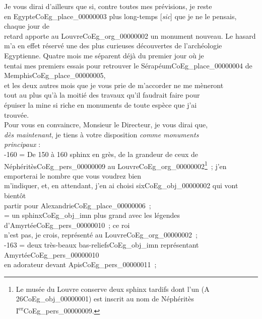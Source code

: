 \documentclass{book}
\begin{document}
\indent Je vous dirai d’ailleurs que si, contre toutes mes prévisions, je reste\\
en Egypte\gls{CoEg_place_00000003} plus long-temps [\textit{sic}] que je ne le pensais, chaque jour de\\
retard apporte au Louvre\gls{CoEg_org_00000002} un monument nouveau. Le hasard\\
m’a en effet réservé une des plus curieuses découvertes de l’archéologie\\
Egyptienne. Quatre mois me séparent déjà du premier jour où je\\
tentai mes premiers essais pour retrouver le Sérapéum\gls{CoEg_place_00000004} de Memphis\gls{CoEg_place_00000005},\\
et les deux autres mois que je vous prie de m’accorder ne me mèneront\\
tout au plus qu’à la moitié des travaux qu’il faudrait faire pour\\
épuiser la mine si riche en monuments de toute espèce que j’ai\\
trouvée.\\
\indent Pour vous en convaincre, Monsieur le Directeur, je vous dirai que,\\
\textit{dès maintenant}, je tiens à votre disposition \textit{comme monuments\\
principaux} :\\
-160 = De 150 à 160 sphinx en grès, de la grandeur de ceux de\\
Néphéritès\gls{CoEg_pers_00000009} au Louvre\gls{CoEg_org_00000002}\footnote{Le musée du Louvre conserve deux sphinx tardifs dont l'un (A 26\gls{CoEg_obj_00000001}) est inscrit au nom de Néphéritès I\textsuperscript{er}\gls{CoEg_pers_00000009}.}~; j’en emporterai le nombre que vous voudrez bien\\
m’indiquer, et, en attendant, j’en ai choisi six\gls{CoEg_obj_00000002} qui vont bientôt\\
partir pour Alexandrie\gls{CoEg_place_00000006}~;\\
 = un sphinx\gls{CoEg_obj_imn} plus grand avec les légendes d’Amyrtée\gls{CoEg_pers_00000010}~; ce roi\\
n’est pas, je crois, représenté au Louvre\gls{CoEg_org_00000002}~;\\
-163 = deux très-beaux bas-reliefs\gls{CoEg_obj_imn} représentant Amyrtée\gls{CoEg_pers_00000010}\\
en adorateur devant Apis\gls{CoEg_pers_00000011}~;\\
\end{document}
